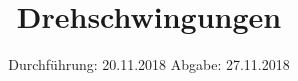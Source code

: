 

\subject{V102}
\title{Drehschwingungen}
\date{%
  Durchführung: 20.11.2018
  \hspace{3em}
  Abgabe: 27.11.2018
}



\maketitle
\thispagestyle{empty}
\tableofcontents
\newpage






\printbibliography{}


